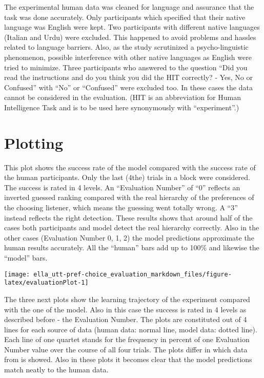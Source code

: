 \documentclass[]{article}
\begin{document}
The experimental human data was cleaned for language and assurance that
the task was done accurately. Only participants which specified that
their native language was English were kept. Two participants with
different native languages (Italian and Urdu) were excluded. This
happened to avoid problems and hassles related to language barriers.
Also, as the study scrutinized a psycho-linguistic phenomenon, possible
interference with other native languages as English were tried to
minimize. Three participants who answered to the question ``Did you read
the instructions and do you think you did the HIT correctly? - Yes, No
or Confused'' with ``No'' or ``Confused'' were excluded too. In these
cases the data cannot be considered in the evaluation. (HIT is an
abbreviation for Human Intelligence Task and is to be used here
synonymously with ``experiment''.)

\hypertarget{plotting}{%
\section{Plotting}\label{plotting}}

This plot shows the success rate of the model compared with the success
rate of the human participants. Only the last (4the) trials in a block
were considered. The success is rated in 4 levels. An ``Evaluation
Number'' of ``0'' reflects an inverted guessed ranking compared with the
real hierarchy of the preferences of the choosing listener, which means
the guessing went totally wrong. A ``3'' instead reflects the right
detection. These results shows that around half of the cases both
participants and model detect the real hierarchy correctly. Also in the
other cases (Evaluation Number 0, 1, 2) the model predictions
approximate the human results accurately. All the ``human'' bars add up
to 100\% and likewise the ``model'' bars.

\begin{center}\texttt{[image: ella\_utt-pref-choice\_evaluation\_markdown\_files/figure-latex/evaluationPlot-1]} \end{center}

The three next plots show the learning trajectory of the experiment
compared with the one of the model. Also in this case the success is
rated in 4 levels as described before - the Evaluation Number. The plots
are constituted out of 4 lines for each source of data (human data:
normal line, model data: dotted line). Each line of one quartet stands
for the frequency in percent of one Evaluation Number value over the
course of all four trials. The plots differ in which data from is
showed. Also in these plots it becomes clear that the model predictions
match neatly to the human data.
\end{document}
